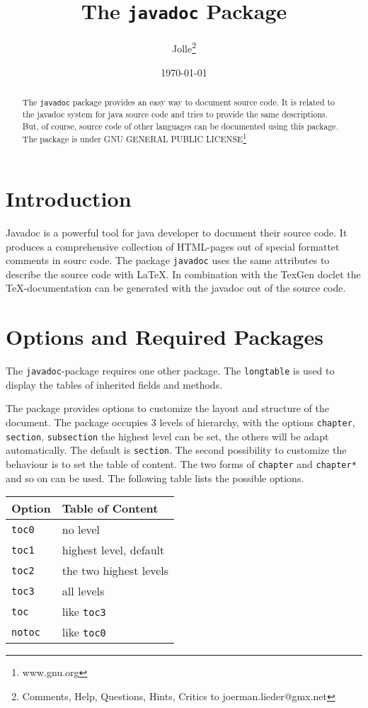 \documentclass[11pt,a4paper]{article}
\newcommand{\code}[1]{\protect\texttt{#1}}
\begin{document}
\title{The \code{javadoc} Package}
\author{Jolle\footnote{Comments, Help, Questions, Hints, Critics to \mbox{joerman.lieder@gmx.net}}  }
\date{\today}
\maketitle

\begin{abstract}
The \code{javadoc} package provides an easy way to document source code. It is related to the javadoc system for java source code and tries to provide the same descriptions. But, of course, source code of other languages can be documented using this package. The package is under GNU GENERAL PUBLIC LICENSE\footnote{www.gnu.org}
\end{abstract}

\tableofcontents

\section{Introduction}
Javadoc is a powerful tool for java developer to document their source code. It produces a comprehensive collection of HTML-pages out of special formattet comments in sourc code. The package \code{javadoc} uses the same attributes to describe the source code with \LaTeX{}. In combination with the TexGen doclet the \TeX-documentation can be generated with the javadoc out of the source code.

\section{Options and Required Packages}
The \code{javadoc}-package requires one other package. The \code{longtable} is used to display the tables of inherited fields and methods.

The package provides options to customize the layout and structure of the document. The package occupies 3 levels of hierarchy, with the options \code{chapter}, \code{section}, \code{subsection} the highest level can be set, the others will be adapt automatically. The default is \code{section}. The second possibility to customize the behaviour is to set the table of content. The two forms of \code{chapter} and \code{chapter*} and so on can be used. The following table lists the possible options.

\begin{center}
	\begin{tabular}{l|l}
	Option & Table of Content \\ \hline
	\code{toc0}  & no level \\
	\code{toc1}  & highest level, default \\
	\code{toc2}  & the two highest levels\\
	\code{toc3}  & all levels \\
	\code{toc}   & like \code{toc3} \\
	\code{notoc} & like \code{toc0}
	\end{tabular}
\end{center}
\end{document}
